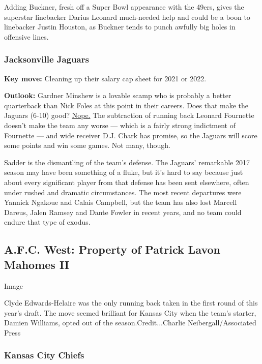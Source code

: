 Adding Buckner, fresh off a Super Bowl appearance with the 49ers, gives
the superstar linebacker Darius Leonard much-needed help and could be a
boon to linebacker Justin Houston, as Buckner tends to punch awfully big
holes in offensive lines.

\hypertarget{jacksonville-jaguars}{%
\subsubsection{\texorpdfstring{\textbf{Jacksonville
Jaguars}}{Jacksonville Jaguars}}\label{jacksonville-jaguars}}

\textbf{Key move:} Cleaning up their salary cap sheet for 2021 or 2022.

\textbf{Outlook:} Gardner Minshew is a lovable scamp who is probably a
better quarterback than Nick Foles at this point in their careers. Does
that make the Jaguars (6-10) good?
\href{https://www.nytimes3xbfgragh.onion/2020/09/02/sports/football/jacksonville-jaguars-salary-cap-fournette.html}{Nope.}
The subtraction of running back Leonard Fournette doesn't make the team
any worse --- which is a fairly strong indictment of Fournette --- and
wide receiver D.J. Chark has promise, so the Jaguars will score some
points and win some games. Not many, though.

Sadder is the dismantling of the team's defense. The Jaguars' remarkable
2017 season may have been something of a fluke, but it's hard to say
because just about every significant player from that defense has been
sent elsewhere, often under rushed and dramatic circumstances. The most
recent departures were Yannick Ngakoue and Calais Campbell, but the team
has also lost Marcell Dareus, Jalen Ramsey and Dante Fowler in recent
years, and no team could endure that type of exodus.

\hypertarget{afc-west-property-of-patrick-lavon-mahomes-ii}{%
\subsection{A.F.C. West: Property of Patrick Lavon Mahomes
II}\label{afc-west-property-of-patrick-lavon-mahomes-ii}}

Image

Clyde Edwards-Helaire was the only running back taken in the first round
of this year's draft. The move seemed brilliant for Kansas City when the
team's starter, Damien Williams, opted out of the
season.Credit...Charlie Neibergall/Associated Press

\hypertarget{kansas-city-chiefs}{%
\subsubsection{\texorpdfstring{\textbf{Kansas City
Chiefs}}{Kansas City Chiefs}}\label{kansas-city-chiefs}}

